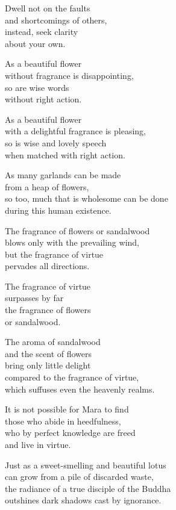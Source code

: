 Dwell not on the faults\\
and shortcomings of others,\\
instead, seek clarity\\
about your own.


As a beautiful flower\\
without fragrance is disappointing,\\
so are wise words\\
without right action.



As a beautiful flower\\
with a delightful fragrance is pleasing,\\
so is wise and lovely speech\\
when matched with right action.


As many garlands can be made\\
from a heap of flowers,\\
so too, much that is wholesome can be done\\
during this human existence.


The fragrance of flowers or sandalwood\\
blows only with the prevailing wind,\\
but the fragrance of virtue\\
pervades all directions.


The fragrance of virtue\\
surpasses by far\\
the fragrance of flowers\\
or sandalwood.


The aroma of sandalwood\\
and the scent of flowers\\
bring only little delight\\
compared to the fragrance of virtue,\\
which suffuses even the heavenly realms.


It is not possible for Mara to find\\
those who abide in heedfulness,\\
who by perfect knowledge are freed\\
and live in virtue.

Just as a sweet-smelling and beautiful lotus\\
can grow from a pile of discarded waste,\\
the radiance of a true disciple of the Buddha\\
outshines dark shadows cast by ignorance.

